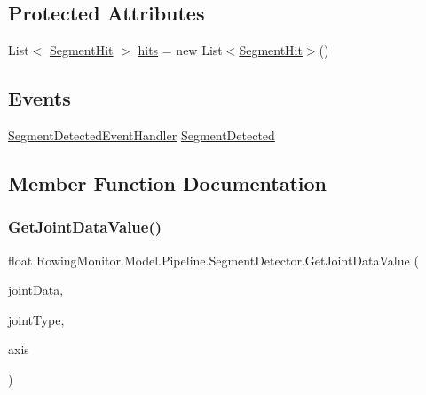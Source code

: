 \subsection*{Protected Attributes}
\begin{DoxyCompactItemize}
\item 
List$<$ \hyperlink{struct_rowing_monitor_1_1_model_1_1_util_1_1_segment_hit}{Segment\+Hit} $>$ \hyperlink{class_rowing_monitor_1_1_model_1_1_pipeline_1_1_segment_detector_a567492ea6e393bed7c946359cdf7c866}{hits} = new List$<$\hyperlink{struct_rowing_monitor_1_1_model_1_1_util_1_1_segment_hit}{Segment\+Hit}$>$()
\end{DoxyCompactItemize}
\subsection*{Events}
\begin{DoxyCompactItemize}
\item 
\hyperlink{class_rowing_monitor_1_1_model_1_1_pipeline_1_1_segment_detector_aee5283f7fa49f68c5c4195449442093c}{Segment\+Detected\+Event\+Handler} \hyperlink{class_rowing_monitor_1_1_model_1_1_pipeline_1_1_segment_detector_aecedec106356c5d32e43e9c9471f12a3}{Segment\+Detected}
\end{DoxyCompactItemize}


\subsection{Member Function Documentation}
\mbox{\label{class_rowing_monitor_1_1_model_1_1_pipeline_1_1_segment_detector_a1f8ffebdfca18aa67a213ca817981161}} 
\subsubsection{\texorpdfstring{Get\+Joint\+Data\+Value()}{GetJointDataValue()}}
{\footnotesize\ttfamily float Rowing\+Monitor.\+Model.\+Pipeline.\+Segment\+Detector.\+Get\+Joint\+Data\+Value (\begin{DoxyParamCaption}\item[{\hyperlink{struct_rowing_monitor_1_1_model_1_1_util_1_1_joint_data}{Joint\+Data}}]{joint\+Data,  }\item[{Joint\+Type}]{joint\+Type,  }\item[{String}]{axis }\end{DoxyParamCaption})\hspace{0.3cm}{\ttfamily [protected]}}

